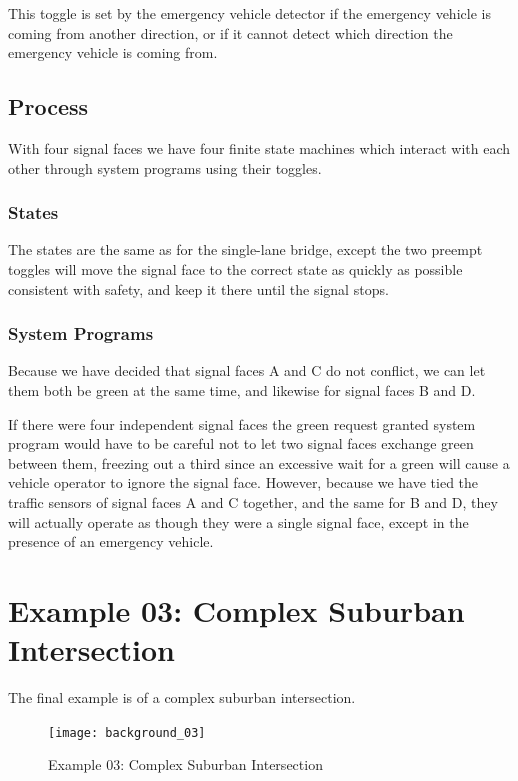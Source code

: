 \documentclass[letterpaper,twoside]{article}
\begin{document}
This toggle is set by the emergency vehicle detector if the emergency
vehicle is coming from another direction, or if it cannot detect
which direction the emergency vehicle is coming from.

\subsection{Process}

With four signal faces we have four finite state machines which
interact with each other through system programs using their
toggles.

\subsubsection{States}

The states are the same as for the single-lane bridge,
except the two preempt toggles will move the signal face
to the correct state as quickly as possible consistent with
safety, and keep it there until the signal stops.

\subsubsection{System Programs}

Because we have decided that signal faces A and C do not conflict,
we can let them both be green at the same time, and likewise for
signal faces B and D.

If there were four independent signal faces the green request granted
system program would have to  be careful not to let two signal faces
exchange green between them, freezing out a third since an excessive
wait for a green will cause a vehicle operator to ignore the signal face.
However, because we have tied the traffic sensors of signal faces A and C
together, and the same for B and D, they will actually operate
as though they were a single signal face, except in the presence
of an emergency vehicle.

\section{Example 03: Complex Suburban Intersection}

The final example is of a complex suburban intersection.
\begin{figure}[htb]
  {\texttt{[image: background\_03]}}
  {\caption{Example 03: Complex Suburban Intersection}
    \label{fig:complex_intersection}}
\end{figure}
\end{document}
